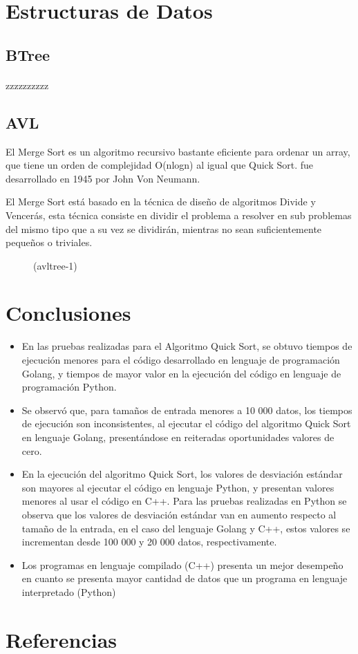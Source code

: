 \documentclass{article}
\begin{document}
	\section{Estructuras de Datos}
        \subsection{BTree}
            \paragraph{}
   zzzzzzzzzz


        \subsection{AVL}

         El Merge Sort es un algoritmo recursivo bastante eficiente para ordenar un array, que tiene un orden de complejidad O(nlogn) al igual que Quick Sort. fue desarrollado en 1945 por John Von Neumann.

         El Merge Sort está basado en la técnica de diseño de algoritmos Divide y Vencerás, esta técnica consiste en dividir el problema a resolver en sub problemas del mismo tipo que a su vez se dividirán, mientras no sean suficientemente  pequeños o triviales.
 

\begin{figure}
    \centering
    (avltree-1)
\end{figure}
    \section{Conclusiones}
        \begin{itemize}
                 \item  En las pruebas realizadas para el Algoritmo Quick Sort, se obtuvo tiempos de ejecución menores para el código desarrollado en lenguaje de programación Golang, y tiempos de mayor valor en la ejecución del código en lenguaje de programación Python.
                 \item	Se observó que, para tamaños de entrada menores a 10 000 datos, los tiempos de ejecución son inconsistentes, al ejecutar el código del algoritmo Quick Sort en lenguaje Golang, presentándose en reiteradas oportunidades valores de cero.
                 \item	En la ejecución del algoritmo Quick Sort, los valores de desviación estándar son mayores al ejecutar el código en lenguaje Python, y presentan valores menores al usar el código en C++. Para las pruebas realizadas en Python se observa que los valores de desviación estándar van en aumento respecto al tamaño de la entrada, en el caso del lenguaje Golang y C++, estos valores se incrementan desde 100 000 y 20 000 datos, respectivamente.
                 \item  Los programas en lenguaje compilado (C++) presenta un mejor desempeño en cuanto se presenta mayor cantidad de datos que un programa en lenguaje interpretado (Python)
        \end{itemize}

    \section{Referencias}
\end{document}
